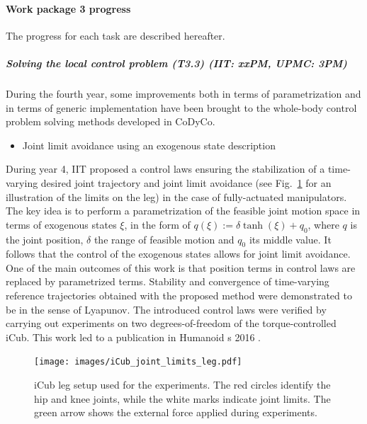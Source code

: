 

 
\paragraph{Work package 3 progress}

The progress for each task are described hereafter.

\subparagraph{Solving the local control problem (T3.3) (IIT: xxPM, UPMC: 3PM)}

During the fourth year, some improvements both in terms of parametrization and in terms of generic implementation have been brought to the whole-body control problem solving methods developed in CoDyCo.

\begin{itemize}
\item {Joint limit avoidance using an exogenous state description}
\end{itemize}
During year 4, IIT proposed a control laws ensuring the stabilization of a time-varying desired joint trajectory and joint limit avoidance (see Fig.~\ref{fig:icub leg limits} for an illustration of the limits on the leg) in the case of fully-actuated manipulators. The key idea is to perform a parametrization of the feasible joint motion space in terms of exogenous states $\xi$, in the form of $q(\xi) := \delta \tanh(\xi) + q_0$, where $q$ is the joint position, $\delta$ the range of feasible motion and $q_0$ its middle value. It follows that the control of the exogenous states allows for joint limit avoidance. One of the main outcomes of this work is that position terms in control laws are replaced by parametrized terms. Stability and convergence of time-varying reference trajectories obtained with the proposed method were demonstrated to be in the sense of Lyapunov. The introduced control laws were verified by carrying out experiments on two degrees-of-freedom of the torque-controlled iCub. This work led to a publication in Humanoid s 2016 \cite{charbonneau2016Humanoids}.

\begin{figure}
   \begin{center}
    \texttt{[image: images/iCub\_joint\_limits\_leg.pdf]}
    \caption{iCub leg setup used for the experiments. The red circles identify the hip and knee joints, while the white marks indicate joint limits. The green arrow shows the external force applied during experiments.}
    \label{fig:icub leg limits}
    \end{center}
\end{figure}


